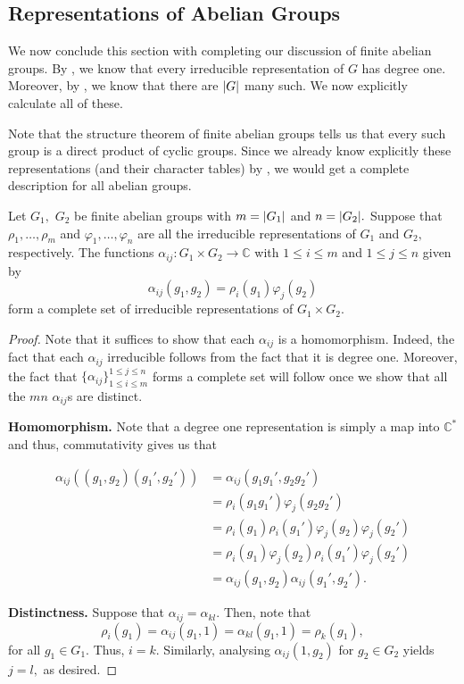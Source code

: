 \subsection{Representations of Abelian Groups}
We now conclude this section with completing our discussion of finite abelian groups. By , we know that every irreducible representation of $G$ has degree one. Moreover, by , we know that there are ${\left\lvert G \right\lvert}$ many such. We now explicitly calculate all of these.

Note that the structure theorem of finite abelian groups tells us that every such group is a direct product of cyclic groups. Since we already know explicitly these representations (and their character tables) by , we would get a complete description for all abelian groups.

\begin{prop}
	Let $G_1,$ $G_2$ be finite abelian groups with $m = {\left\lvert G_1 \right\lvert}$ and $n = {\left\lvert G_2 \right\lvert}.$ Suppose that $\rho_1, \ldots, \rho_m$ and $\varphi_1, \ldots, \varphi_n$ are all the irreducible representations of $G_1$ and $G_2,$ respectively. The functions $\alpha_{ij} : G_1 \times G_2 \to \mathbb{C}$ with $1 \le i \le m$ and $1 \le j \le n$ given by
	\begin{equation*} 
		\alpha_{ij}(g_1, g_2) = \rho_i(g_1)\varphi_j(g_2)
	\end{equation*}
	form a complete set of irreducible representations of $G_1 \times G_2.$
\end{prop}
\begin{proof} 
	Note that it suffices to show that each $\alpha_{ij}$ is a homomorphism. Indeed, the fact that each $\alpha_{ij}$ irreducible follows from the fact that it is degree one. Moreover, the fact that $\{\alpha_{ij}\}_{1 \le i \le m}^{1 \le j \le n}$ forms a complete set will follow once we show that all the $mn$ $\alpha_{ij}$s are distinct.

	\textbf{Homomorphism.} Note that a degree one representation is simply a map into $\mathbb{C}^*$ and thus, commutativity gives us that

	\begin{align*} 
		\alpha_{ij}\left((g_1, g_2)(g_1', g_2')\right) &= \alpha_{ij}(g_1g_1', g_2g_2')\\
		&= \rho_i(g_1g_1')\varphi_j(g_2g_2')\\
		&= \rho_i(g_1)\rho_i(g_1')\varphi_j(g_2)\varphi_j(g_2')\\
		&= \rho_i(g_1)\varphi_j(g_2)\rho_i(g_1')\varphi_j(g_2')\\
		&= \alpha_{ij}(g_1, g_2)\alpha_{ij}(g_1', g_2').
	\end{align*}

	\textbf{Distinctness.} Suppose that $\alpha_{ij} = \alpha_{kl}.$ Then, note that
	\begin{equation*} 
		\rho_i(g_1) = \alpha_{ij}(g_1, 1) = \alpha_{kl}(g_1, 1) = \rho_k(g_1),
	\end{equation*}
	for all $g_1 \in G_1.$ Thus, $i = k.$ Similarly, analysing $\alpha_{ij}(1, g_2)$ for $g_2 \in G_2$ yields $j = l,$ as desired.	
\end{proof}

